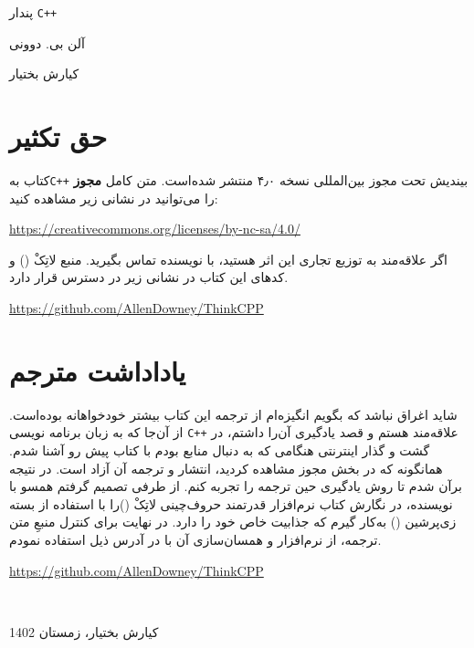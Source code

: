 \documentclass{book}
\begin{document}
\thispagestyle{empty}
\begin{titlepage}
 \vspace*{1cm}
 
 
 {\huge\raggedleft پندار \texttt{C++} \par}
 \noindent\hrulefill\par
 {\LARGE\raggedright آلن بی. دوونی\par}
 \vfill
 {\small\raggedright کیارش بختیار\par}
 \setcounter{page}{0}
\end{titlepage}


\section{حق تکثیر}
کتاب به\texttt{C++} بیندیش تحت مجوز بین‌المللی    نسخه ۴٫۰ منتشر شده‌است. 
متن کامل \textbf{مجوز} را می‌توانید در نشانی زیر مشاهده کنید:

\begin{latin}
\url{https://creativecommons.org/licenses/by-nc-sa/4.0/}
\end{latin}
اگر علاقه‌مند به توزیع تجاری این اثر هستید، با نویسنده تماس بگیرید. 
منبع لاتِکْ (\lr{\LaTeX}) و کدهای این کتاب در نشانی زیر در دسترس قرار دارد.
\begin{latin}
	\url{https://github.com/AllenDowney/ThinkCPP}
\end{latin}

\newpage

\section{یاداداشت مترجم}
شاید اغراق نباشد که بگویم انگیزه‌ام از ترجمه این کتاب بیشتر خودخواهانه بوده‌است. از آن‌جا که به زبان برنامه نویسی \texttt{C++}  علاقه‌مند هستم و قصد یادگیری آن‌را داشتم، در گشت و گذار اینترنتی هنگامی که به دنبال منابع بودم  با کتاب پیش رو آشنا شدم. همانگونه که در بخش مجوز مشاهده کردید، انتشار و ترجمه آن آزاد است. در نتیجه برآن شدم تا روش یادگیری حین ترجمه را تجربه کنم. از طرفی تصمیم گرفتم همسو با نویسنده، در نگارش کتاب نرم‌افزار قدرتمند حروف‌چینی لاتِکْ (\lr{\LaTeX})را با استفاده از بسته زی‌پرشین  (\lr{\XePersian}) به‌کار گیرم که جذابیت خاص خود را دارد. در نهایت برای کنترل منبعِ متن ترجمه، از نرم‌افزار  و همسان‌سازی آن با  در آدرس ذیل استفاده نمودم.


\begin{latin}
	\url{https://github.com/AllenDowney/ThinkCPP}
	\
	
\end{latin}




\
\begin{flushleft}
	کیارش بختیار، زمستان 1402
	
\end{flushleft}


\frontmatter
\tableofcontents

\mainmatter


\appendix


\printindex
\end{document}
